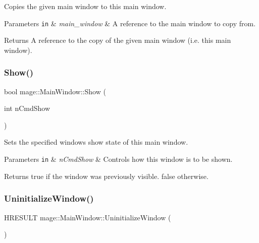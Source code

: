 Copies the given main window to this main window.


\begin{DoxyParams}[1]{Parameters}
\mbox{\tt in}  & {\em main\+\_\+window} & A reference to the main window to copy from. \\
\hline
\end{DoxyParams}
\begin{DoxyReturn}{Returns}
A reference to the copy of the given main window (i.\+e. this main window). 
\end{DoxyReturn}
\hypertarget{classmage_1_1_main_window_aefa6d872bbe7702f51e4a0ca62ea587f}{}\label{classmage_1_1_main_window_aefa6d872bbe7702f51e4a0ca62ea587f} 
\subsubsection{\texorpdfstring{Show()}{Show()}}
{\footnotesize\ttfamily bool mage\+::\+Main\+Window\+::\+Show (\begin{DoxyParamCaption}\item[{int}]{n\+Cmd\+Show }\end{DoxyParamCaption})}

Sets the specified window\textquotesingle{}s show state of this main window.


\begin{DoxyParams}[1]{Parameters}
\mbox{\tt in}  & {\em n\+Cmd\+Show} & Controls how this window is to be shown. \\
\hline
\end{DoxyParams}
\begin{DoxyReturn}{Returns}
{\ttfamily true} if the window was previously visible. {\ttfamily false} otherwise. 
\end{DoxyReturn}
\hypertarget{classmage_1_1_main_window_aa1ba43fc0a12ea43636fe0e62242a47d}{}\label{classmage_1_1_main_window_aa1ba43fc0a12ea43636fe0e62242a47d} 
\subsubsection{\texorpdfstring{Uninitialize\+Window()}{UninitializeWindow()}}
{\footnotesize\ttfamily H\+R\+E\+S\+U\+LT mage\+::\+Main\+Window\+::\+Uninitialize\+Window (\begin{DoxyParamCaption}{ }\end{DoxyParamCaption})\hspace{0.3cm}{\ttfamily [private]}}

